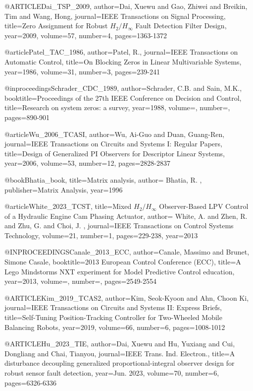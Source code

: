
@ARTICLE{Dai_TSP_2009,  
author={Dai, Xuewu and Gao, Zhiwei and Breikin, Tim and Wang, Hong},  journal={IEEE Transactions on Signal Processing},   title={Zero Assignment for Robust  ${H}_{2}/{H}_{\infty}$ Fault Detection Filter Design},   year={2009},  volume={57},  number={4},  pages={1363-1372}}

@article{Patel_TAC_1986,
  author={Patel, R.},
  journal={IEEE Transactions on Automatic Control}, 
  title={On Blocking Zeros in Linear Multivariable Systems}, 
  year={1986},
  volume={31},
  number={3},
  pages={239-241}}

@inproceedings{Schrader_CDC_1989,
  author={Schrader, C.B. and Sain, M.K.},
  booktitle={Proceedings of the 27th IEEE Conference on Decision and Control}, 
  title={Research on system zeros: a survey}, 
  year={1988},
  volume={},
  number={},
  pages={890-901}}

@article{Wu_2006_TCASI,
  author={Wu, Ai-Guo and Duan, Guang-Ren},
  journal={IEEE Transactions on Circuits and Systems I: Regular Papers}, 
  title={Design of Generalized {PI} Observers for Descriptor Linear Systems}, 
  year={2006},
  volume={53},
  number={12},
  pages={2828-2837}}

@book{Bhatia_book,
  title={Matrix analysis},
  author={ Bhatia, R. },
  publisher={Matrix Analysis},
  year={1996}}

@article{White_2023_TCST,
  title={Mixed ${H}_{2} / {H}_{\infty}$ Observer-Based LPV Control of a Hydraulic Engine Cam Phasing Actuator},
  author={ White, A.  and  Zhen, R.  and  Zhu, G.  and  Choi, J. },
  journal={IEEE Transactions on Control Systems Technology},
  volume={21},
  number={1},
  pages={229-238},
  year={2013}}

@INPROCEEDINGS{Canale_2013_ECC,
  author={Canale, Massimo and Brunet, Simone Casale},
  booktitle={2013 European Control Conference (ECC)}, 
  title={A Lego Mindstorms NXT experiment for Model Predictive Control education}, 
  year={2013},
  volume={},
  number={},
  pages={2549-2554}}

@ARTICLE{Kim_2019_TCAS2,
  author={Kim, Seok-Kyoon and Ahn, Choon Ki},
  journal={IEEE Transactions on Circuits and Systems II: Express Briefs}, 
  title={Self-Tuning Position-Tracking Controller for Two-Wheeled Mobile Balancing Robots}, 
  year={2019},
  volume={66},
  number={6},
  pages={1008-1012}}

@ARTICLE{Hu_2023_TIE,
  author={Dai, Xuewu and Hu, Yuxiang and Cui, Dongliang and Chai, Tianyou},
  journal={IEEE Trans. Ind. Electron.}, 
  title={A disturbance decoupling generalized proportional-integral observer design for robust sensor fault detection}, 
  year={Jun. 2023},
  volume={70},
  number={6},
  pages={6326-6336}}

